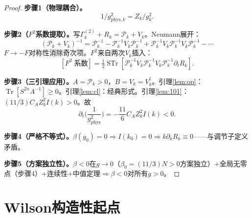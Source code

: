 \documentclass[12pt,a4paper]{article}
\theoremstyle{plain}
\theoremstyle{definition}\newtheorem{definition}[theorem]{定义}
\theoremstyle{remark}\newtheorem{remark}[theorem]{注记}
\begin{document}
\begin{proof}
\textbf{步骤1（物理耦合）。}
\begin{equation}\label{eq:gphys}
1/g_{\mathrm{phys},k}^2 = Z_k/g_k^2.
\end{equation}

\textbf{步骤2（$F^2$系数提取）。}写$\Gamma_k^{(2)}+R_k=\mathcal{P}_k+V_k$。Neumann展开：
\begin{equation}\label{eq:Neumann}
(\mathcal{P}_k+V_k)^{-1} = \mathcal{P}_k^{-1}-\mathcal{P}_k^{-1}V_k\mathcal{P}_k^{-1}+\mathcal{P}_k^{-1}V_k\mathcal{P}_k^{-1}V_k\mathcal{P}_k^{-1}-\cdots
\end{equation}
$F\to -F$对称性消除奇次项。$F^2$来自两次$V_k$插入：
\begin{equation}\label{eq:F2trace}
[F^2\;\text{系数}] = \tfrac{1}{2}\operatorname{STr}[\mathcal{P}_k^{-1}V_k\mathcal{P}_k^{-1}V_k\mathcal{P}_k^{-1}\partial_tR_k].
\end{equation}

\textbf{步骤3（三引理应用）。}$A=\mathcal{P}_k>0$，$B=V_k=V_k^\dagger$。引理\ref{lem:op}：$\operatorname{Tr}[S^{2n}A^{-1}]\geq 0$。引理\ref{lem:cl}：经典形式。引理\ref{lem:101}：$(11/3)C_AZ_k^2I(k)>0$。故
\begin{equation}\label{eq:betaflow}
\partial_t\!\Big(\frac{1}{g_{\mathrm{phys}}^2}\Big) = -\frac{11}{6}C_AZ_k^2I(k) < 0.
\end{equation}

\textbf{步骤4（严格不等式）。}$\beta(g_0)=0\Rightarrow I(k_0)=0\Rightarrow k\partial_kR_k\equiv 0$——与调节子定义矛盾。

\textbf{步骤5（方案独立性）。}$\beta<0$在$g\to 0$（$\beta_0=(11/3)N>0$方案独立）$+$全局无零点（步骤4）$+$连续性$+$中值定理$\Rightarrow\beta<0$对所有$g>0$。
\end{proof}


\section{Wilson构造性起点}\label{sec:wilson}
\end{document}
